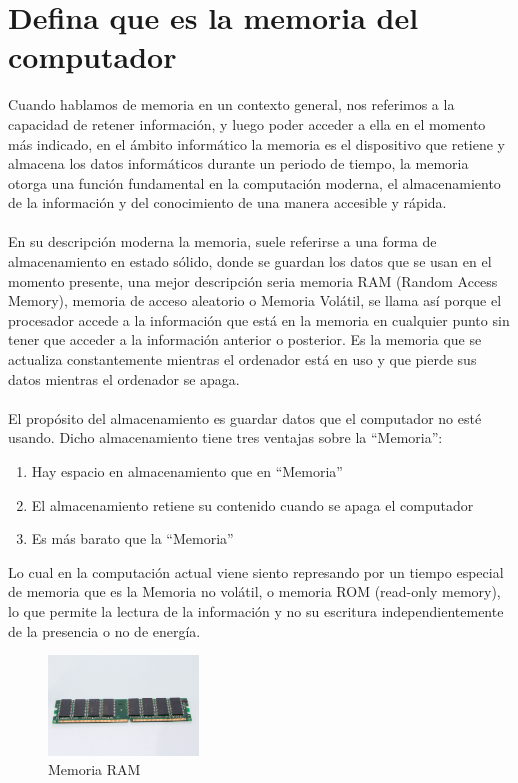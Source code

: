 \documentclass{article}
\begin{document}
	\section{Defina que es la memoria del computador} \label{defina}
	Cuando hablamos de memoria en un contexto general, nos referimos a la capacidad de retener información, y luego poder acceder a ella en el momento más indicado, en el ámbito informático la memoria es el dispositivo que retiene y almacena los datos informáticos durante un periodo de tiempo, la memoria otorga una función fundamental en la computación moderna, el almacenamiento de la información y del conocimiento de una manera accesible y rápida.
	\\\\
	En su descripción moderna la memoria, suele referirse a una forma de almacenamiento en estado sólido, donde se guardan los datos que se usan en el momento presente, una mejor descripción seria memoria RAM (Random Access Memory), memoria de acceso aleatorio o Memoria Volátil, se llama así porque el procesador accede a la información que está en la memoria en cualquier punto sin tener que acceder a la información anterior o posterior. Es la memoria que se actualiza constantemente mientras el ordenador está en uso y que pierde sus datos mientras el ordenador se apaga.
	\\\\
	El propósito del almacenamiento es guardar datos que el computador no esté usando. Dicho almacenamiento tiene tres ventajas sobre la “Memoria”:
	
	\begin{enumerate}
		
		\item Hay espacio en almacenamiento que en “Memoria”
		\item El almacenamiento retiene su contenido cuando se apaga el computador
		\item Es más barato que la “Memoria”
		
	\end{enumerate}

	 Lo cual en la computación actual viene siento represando por un tiempo especial de memoria que es la Memoria no volátil, o memoria ROM (read-only memory), lo que permite la lectura de la información y no su escritura independientemente de la presencia o no de energía.
	 \begin{figure}[h]
	 	\includegraphics[width=4cm]{ram.jpg}
	 	\centering
	 	\caption{Memoria RAM}
	 	\label{ram}
	 \end{figure}
 
\end{document}
